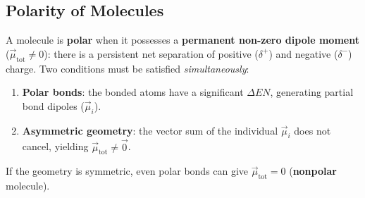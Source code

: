 \documentclass[a4paper,11pt]{article}
\begin{document}
\subsection{Polarity of Molecules}

\begin{definizione}
A molecule is \textbf{polar} when it possesses a \textbf{permanent non-zero dipole moment} ($\vec{\mu}_{\text{tot}} \neq 0$): there is a persistent net separation of positive ($\delta^+$) and negative ($\delta^-$) charge. Two conditions must be satisfied \textit{simultaneously}:
\begin{enumerate}
  \item \textbf{Polar bonds}: the bonded atoms have a significant $\Delta EN$, generating partial bond dipoles ($\vec{\mu}_i$).
  \item \textbf{Asymmetric geometry}: the vector sum of the individual $\vec{\mu}_i$ does not cancel, yielding $\vec{\mu}_{\text{tot}} \neq \vec{0}$.
\end{enumerate}
If the geometry is symmetric, even polar bonds can give $\vec{\mu}_{\text{tot}} = 0$ (\textbf{nonpolar} molecule).
\end{definizione}

\vspace{8pt}
\end{document}
